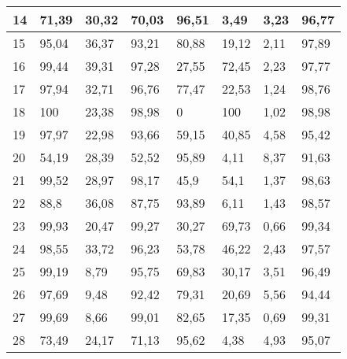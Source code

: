 \begin{longtable}[c]{|l|l|l|l|l|l|l|l|}
14              & 71,39        & 30,32        & 70,03       & 96,51         & 3,49          & 3,23          & 96,77         \\ \hline
15              & 95,04        & 36,37        & 93,21       & 80,88         & 19,12         & 2,11          & 97,89         \\ \hline
16              & 99,44        & 39,31        & 97,28       & 27,55         & 72,45         & 2,23          & 97,77         \\ \hline
17              & 97,94        & 32,71        & 96,76       & 77,47         & 22,53         & 1,24          & 98,76         \\ \hline
18              & 100          & 23,38        & 98,98       & 0             & 100           & 1,02          & 98,98         \\ \hline
19              & 97,97        & 22,98        & 93,66       & 59,15         & 40,85         & 4,58          & 95,42         \\ \hline
20              & 54,19        & 28,39        & 52,52       & 95,89         & 4,11          & 8,37          & 91,63         \\ \hline
21              & 99,52        & 28,97        & 98,17       & 45,9          & 54,1          & 1,37          & 98,63         \\ \hline
22              & 88,8         & 36,08        & 87,75       & 93,89         & 6,11          & 1,43          & 98,57         \\ \hline
23              & 99,93        & 20,47        & 99,27       & 30,27         & 69,73         & 0,66          & 99,34         \\ \hline
24              & 98,55        & 33,72        & 96,23       & 53,78         & 46,22         & 2,43          & 97,57         \\ \hline
25              & 99,19        & 8,79         & 95,75       & 69,83         & 30,17         & 3,51          & 96,49         \\ \hline
26              & 97,69        & 9,48         & 92,42       & 79,31         & 20,69         & 5,56          & 94,44         \\ \hline
27              & 99,69        & 8,66         & 99,01       & 82,65         & 17,35         & 0,69          & 99,31         \\ \hline
28              & 73,49        & 24,17        & 71,13       & 95,62         & 4,38          & 4,93          & 95,07         \\ \hline

\end{longtable}
